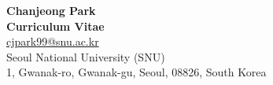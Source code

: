 \documentclass[a4paper,10pt]{extarticle}
\begin{document}
\pagestyle{empty}

\begin{center}
\textbf{\LARGE Chanjeong Park }\\[6pt] %
\textbf{\large Curriculum Vitae}\\[6pt]

\href{mailto:cjpark99@snu.ac.kr}{cjpark99@snu.ac.kr}\\
Seoul National University (SNU)\\
1, Gwanak-ro, Gwanak-gu, Seoul, 08826, South Korea\\
\end{center}
















% 




\end{document}
